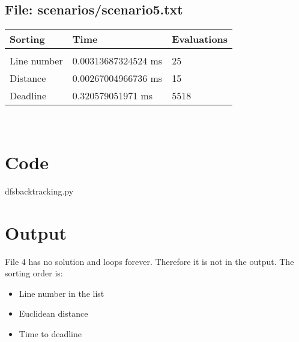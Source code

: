 \documentclass{scrartcl}
\begin{document}
\begin{tabular}{ l | l l}
\end{tabular} \subsection{File: scenarios/scenario5.txt}\begin{tabular}{ l | l l} \\Sorting &Time & Evaluations\\\hline
\\ Line number &
0.00313687324524 ms
& 25
\\ Distance &
0.00267004966736 ms
& 15
\\ Deadline &
0.320579051971 ms
& 5518
\end{tabular} \\

\newpage
\section{Code}
dfsbacktracking.py


\newpage
\section{Output}
File 4 has no solution and loops forever. Therefore it is not in the output.
The sorting order is:
  \begin{itemize}
    \item Line number in the list
    \item Euclidean distance
    \item Time to deadline
  \end{itemize}

\end{document}
